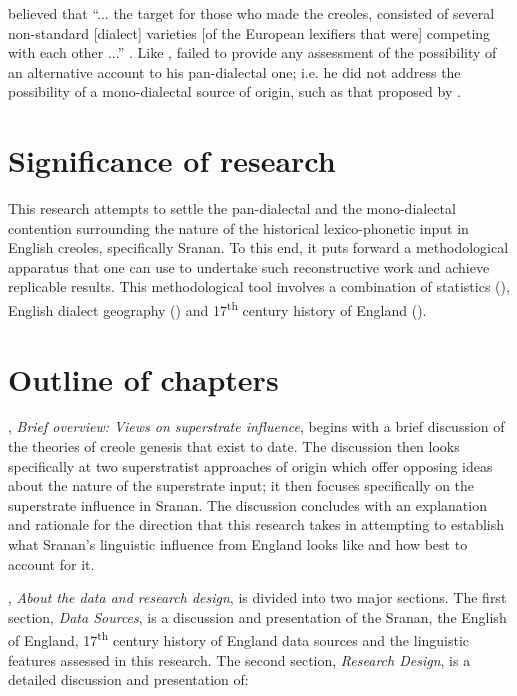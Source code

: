 \citet{Mufwene08, Mufwene01} believed that ``... the target for those who made the creoles, consisted of several non-standard [dialect] varieties [of the European lexifiers that were] competing with each other ...'' \citep[21]{Mufwene08}. Like \citet{Smith08, Smith87}, \citet{Mufwene08, Mufwene01} failed to provide any assessment of the possibility of an alternative account to his pan-dialectal one; i.e. he did not address the possibility of a mono-dialectal source of origin, such as that proposed by \citet{Smith08, Smith87}.

\section {Significance of research}\label{1.4}
This research attempts to settle the pan-dialectal and the mono-dialectal contention surrounding the nature of the historical lexico-phonetic input in English creoles, specifically Sranan. To this end, it puts forward a methodological apparatus that one can use to undertake such reconstructive work and achieve replicable results. This methodological tool involves a combination of statistics (), English dialect geography () and 17\textsuperscript{th} century history of England ().

\section{Outline of chapters}\label{1.5}
, \emph{Brief overview: Views on superstrate influence}, begins with a brief discussion of the theories of creole genesis that exist to date. The discussion then looks specifically at two superstratist approaches of origin which offer opposing ideas about the nature of the superstrate input; it then focuses specifically on the superstrate influence in Sranan. The discussion concludes with an explanation and rationale for the direction that this research takes in attempting to establish what Sranan's linguistic influence from England looks like and how best to account for it.

, \emph{About the data and research design}, is divided into two major sections. The first section, \emph{Data Sources}, is a discussion and presentation of the Sranan, the English of England, 17\textsuperscript{th} century history of England data sources and the linguistic features assessed in this research. The second section, \emph{Research Design}, is a detailed discussion and presentation of:

